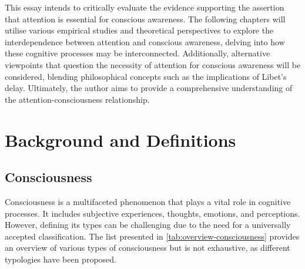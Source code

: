 \documentclass[10pt]{article}
\begin{document}
\begin{sloppypar}
  This essay intends to critically evaluate the evidence supporting the assertion that attention is essential for conscious awareness. The following chapters will utilise various empirical studies and theoretical perspectives to explore the interdependence between attention and conscious awareness, delving into how these cognitive processes may be interconnected. Additionally, alternative viewpoints that question the necessity of attention for conscious awareness will be considered, blending philosophical concepts such as the implications of Libet’s delay. Ultimately, the author aims to provide a comprehensive understanding of the attention-consciousness relationship.

  \section{Background and Definitions}
  \label{sec:background}

  \subsection{Consciousness}
  \label{sec:consciousness}

  Consciousness is a multifaceted phenomenon that plays a vital role in cognitive processes. It includes subjective experiences, thoughts, emotions, and perceptions. However, defining its types can be challenging due to the need for a universally accepted classification. The list presented in \autoref{tab:overview-consciousness} provides an overview of various types of consciousness but is not exhaustive, as different typologies have been proposed.


\end{sloppypar}
\end{document}
